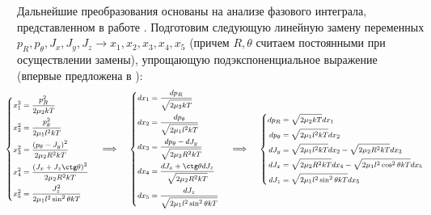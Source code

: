 Дальнейшие преобразования основаны на анализе фазового интеграла, представленном в работе \cite{vigasin2015}. Подготовим следующую линейную замену переменных $p_R, p_\theta, J_x, J_y, J_z \rightarrow x_1, x_2, x_3, x_4, x_5$ (причем $R, \theta$ считаем постоянными при осуществлении замены), упрощающую подэкспоненциальное выражение (впервые предложена в \cite{ozaki1985}):
\vverh
\begin{gather}
	\hspace*{-0.5cm}
	\everymath{\scriptstyle}
	\footnotesize
	\left\{
	\begin{aligned}
	x_1^2 &= \frac{p_R^2}{2 \mu_2 kT} \\
	x_2^2 &= \frac{p_\theta^2}{2 \mu_1 l^2 kT} \\
	x_3^2 &= \frac{ \lb p_\theta - J_y \rb^2}{2 \mu_2 R^2 k T} \\
	x_4^2 &= \frac{ \lb J_x + J_z \ctg \theta \rb^2}{2 \mu_2 R^2 k T} \\
	x_5^2 &= \frac{J_z^2}{2 \mu_1 l^2 \sin^2 \theta kT}
	\end{aligned}
	\right. \quad \implies \quad 
	\left\{
	\begin{aligned}
	dx_1 &= \frac{dp_R}{\sqrt{ 2 \mu_2 k T}} \\
	dx_2 &= \frac{dp_\theta}{\sqrt{2 \mu_1 l^2 k T}} \\
	dx_3 &= \frac{dp_\theta - dJ_y}{\sqrt{2 \mu_2 R^2 k T}} \\
	dx_4 &= \frac{dJ_x + \ctg \theta dJ_z}{ \sqrt{2 \mu_2 R^2 k T}} \\
	dx_5 &= \frac{dJ_z}{\sqrt{2 \mu_1 l^2 \sin^2 \theta k T}}
	\end{aligned}
	\right. \quad \implies \quad
	\left\{
	\begin{aligned}
		dp_R &= \sqrt{2 \mu_2 k T} dx_1 \\
		dp_\theta &= \sqrt{2 \mu_1 l^2 kT} dx_2 \\
		dJ_y &= \sqrt{2 \mu_1 l^2 kT} dx_2 - \sqrt{2 \mu_2 R^2 kT} dx_3 \\
		dJ_x &= \sqrt{2 \mu_2 R^2 kT} dx_4 - \sqrt{2 \mu_1 l^2 \cos^2 \theta kT} dx_5 \\
		dJ_z &= \sqrt{2 \mu_1 l^2 \sin^2 \theta kT} dx_5
	\end{aligned}
	\right.
	\notag
\end{gather}

